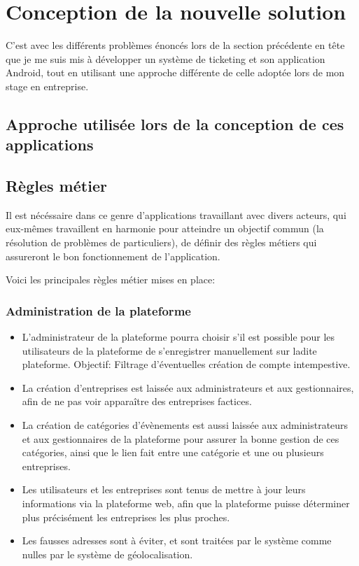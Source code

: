 \documentclass[12pt,table,a4paper]{report}
\begin{document}
\section{Conception de la nouvelle solution}
C'est avec les différents problèmes énoncés lors de la section précédente en tête que je me suis mis à développer un système de ticketing et son application Android, tout en utilisant une approche différente de celle adoptée lors de mon stage en entreprise.

\subsection{Approche utilisée lors de la conception de ces applications}
\todo{}

\subsection{Règles métier}
Il est nécéssaire dans ce genre d'applications travaillant avec divers acteurs, qui eux-mêmes travaillent en harmonie pour atteindre un objectif commun (la résolution de problèmes de particuliers), de définir des règles métiers qui assureront le bon fonctionnement de l'application.

Voici les principales règles métier mises en place:

\subsubsection{Administration de la plateforme}
\begin{itemize}
	\item{L'administrateur de la plateforme pourra choisir s'il est possible pour les utilisateurs de la plateforme de s'enregistrer manuellement sur ladite plateforme. Objectif: Filtrage d'éventuelles création de compte intempestive.}
	\item{La création d'entreprises est laissée aux administrateurs et aux gestionnaires, afin de ne pas voir apparaître des entreprises factices.}
	\item{La création de catégories d'évènements est aussi laissée aux administrateurs et aux gestionnaires de la plateforme pour assurer la bonne gestion de ces catégories, ainsi que le lien fait entre une catégorie et une ou plusieurs entreprises.}
	\item{Les utilisateurs et les entreprises sont tenus de mettre à jour leurs informations via la plateforme web, afin que la plateforme puisse déterminer plus précisément les entreprises les plus proches.}
	\item{Les fausses adresses sont à éviter, et sont traitées par le système comme nulles par le système de géolocalisation.}
\end{itemize}
\end{document}

